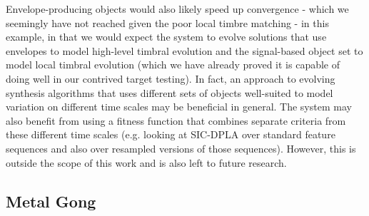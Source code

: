 \documentclass[12pt]{report} 	%
\numberwithin{figure}{chapter}
\numberwithin{table}{chapter}
\numberwithin{equation}{chapter}
\begin{document}
\begin{flushleft}
Envelope-producing objects would also likely speed up convergence - which we seemingly have not reached given the poor local timbre matching - in this example, in that we would expect the system to evolve solutions that use envelopes to model high-level timbral evolution and the signal-based object set to model local timbral evolution (which we have already proved it is capable of doing well in our contrived target testing). In fact, an approach to evolving synthesis algorithms that uses different sets of objects well-suited to model variation on different time scales may be beneficial in general. The system may also benefit from using a fitness function that combines separate criteria from these different time scales (e.g. looking at SIC-DPLA over standard feature sequences and also over resampled versions of those sequences). However, this is outside the scope of this work and is also left to future research.

\subsection{Metal Gong}


\end{flushleft}
\end{document}
